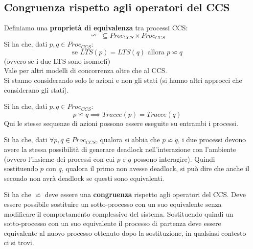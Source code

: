 \subsection{Congruenza rispetto agli operatori del CCS}
\begin{definizione}
  Definiamo una \textbf{proprietà di equivalenza} tra processi CCS:
  \[\backsimeq \,\,\subseteq  Proc_{CCS}\times  Proc_{CCS}\]
  Si ha che, dati $p, q\in Proc_{CCS}$:
  \[\mbox{se }LTS(p)=LTS(q)\mbox{ allora } p\backsimeq q\]
  (ovvero se i due LTS sono isomorfi)\\
  Vale per altri modelli di concorrenza oltre che al CCS.\\
  Si stanno considerando solo le azioni e non gli stati (si hanno altri approcci
  che considerano gli stati).
\end{definizione}
\begin{definizione}
  Si ha che, dati $p, q\in Proc_{CCS}$:
  \[p\backsimeq q\implies Tracce(p)=Tracce(q)\]
  Qui le stesse sequenze di azioni possono essere eseguite su entrambi i
  processi.  
\end{definizione}
\begin{definizione}
  Si ha che, dati $\forall p, q\in Proc_{CCS}$, qualora si abbia che $p\backsimeq
  q$, i due processi devono avere la stessa possibilità di generare deadlock
  nell'interazione con l'ambiente (ovvero l'insieme dei processi con cui $p$ e
  $q$ possono interagire). Quindi sostituendo $p$ con $q$, qualora il
  primo non avesse deadlock, si può dire che anche il secondo non avrà deadlock
  se questi sono equivalenti.
\end{definizione}
\begin{definizione}
  Si ha che $\backsimeq$ deve essere una \textbf{congruenza} rispetto agli
  operatori del CCS. Deve essere possibile sostituire un sotto-processo con un
  suo equivalente senza modificare il comportamento complessivo del
  sistema. Sostituendo quindi un sotto-processo con un suo equivalente il
  processo di partenza deve essere equivalente al nuovo processo ottenuto dopo
  la sostituzione, in qualsiasi contesto ci si trovi.
\end{definizione}
